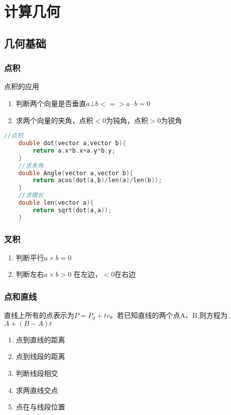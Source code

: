 \documentclass[]{article}
\begin{document}
\tableofcontents

\section{计算几何}
\label{sec:geometry}

\subsection{几何基础}
\label{sec:geometry_basic}
\subsubsection{点积}
\label{sec:dianji}
点积的应用  

\begin{enumerate}
\item 判断两个向量是否垂直$a\bot b <=> a·b = 0$
\item 求两个向量的夹角，点积$<0$为钝角，点积$>0$为锐角
\end{enumerate}

\begin{lstlisting}[language={c}]
    //点积
    double dot(vector a,vector b){
        return a.x*b.x+a.y*b.y;
    }
    //求夹角
    double Angle(vector a,vector b){
        return acos(dot(a,b)/len(a)/len(b));
    }
    //求模长
    double len(vector a){ 
        return sqrt(dot(a,a));
    }
\end{lstlisting}

\subsubsection{叉积}
\label{sec:chaji}

\begin{enumerate}
    \item 判断平行$a\times b = 0$
    \item 判断左右$a\times b > 0$ 在左边，$< 0$在右边
\end{enumerate}

\subsubsection{点和直线}

直线上所有的点表示为$P = P_0+tv$。若已知直线的两个点A、B,则方程为$A+(B-A)t$
\begin{enumerate}
    \item 点到直线的距离
    \item 点到线段的距离
    \item 判断线段相交
    \item 求两直线交点
    \item 点在与线段位置
\end{enumerate}
\end{document}
